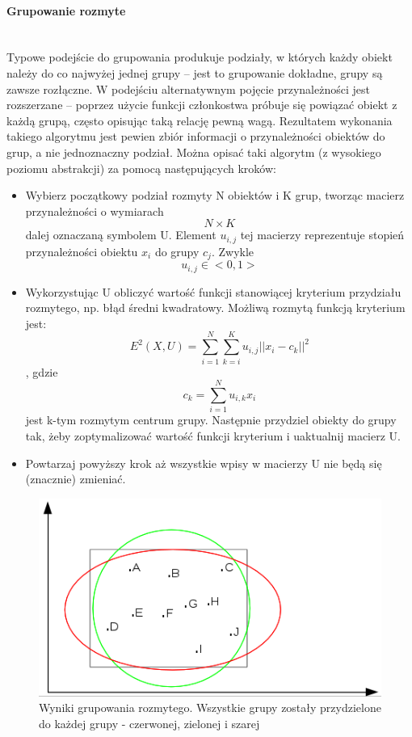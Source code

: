 \documentclass{article}
\newcommand{\myparagraph}[1]{\paragraph{#1}\mbox{}\\}
\begin{document}
\myparagraph{Grupowanie rozmyte}

Typowe podejście do grupowania produkuje podziały, w których każdy obiekt należy do co najwyżej jednej grupy – jest to grupowanie dokładne, grupy są zawsze rozłączne. W podejściu alternatywnym pojęcie przynależności jest rozszerzane – poprzez użycie funkcji członkostwa próbuje się powiązać obiekt z każdą grupą, często opisując taką relację pewną wagą. Rezultatem wykonania takiego algorytmu jest pewien zbiór informacji o przynależności obiektów do grup, a nie jednoznaczny podział. Można opisać taki algorytm (z wysokiego poziomu abstrakcji) za pomocą następujących kroków:

\begin{itemize}
	\item Wybierz początkowy podział rozmyty N obiektów i K grup, tworząc macierz przynależności o wymiarach \[N\times K\] dalej oznaczaną symbolem U. Element $u_{i,j}$ tej macierzy reprezentuje stopień przynależności obiektu $x_{i}$ do grupy $c_{j}$. Zwykle \[u_{i,j} \in <0, 1> \]
	\item Wykorzystując U obliczyć wartość funkcji stanowiącej kryterium przydziału rozmytego, np. błąd średni kwadratowy. Możliwą rozmytą funkcją kryterium jest:
	\[E^2(X, U) = \sum_{i=1}^{N}\sum_{k=i}^{K}u_{i,j}||x_{i}-c_{k}||^2 \], gdzie \[ c_{k} = \sum_{i=1}^{N}u_{i,k}x_{i} \] jest k-tym rozmytym centrum grupy. Następnie przydziel obiekty do grupy tak, żeby zoptymalizować wartość funkcji kryterium i uaktualnij macierz U.
	\item Powtarzaj powyższy krok aż wszystkie wpisy w macierzy U nie będą się (znacznie) zmieniać.
\end{itemize}

\begin{figure}[H]
	\centering
	\includegraphics[scale=0.95]{rozmytewyniki.png}
	\caption{Wyniki grupowania rozmytego. Wszystkie grupy zostały przydzielone do każdej grupy - czerwonej, zielonej i szarej}
	\label{fig:rozmytewyniki}
\end{figure}
\end{document}
